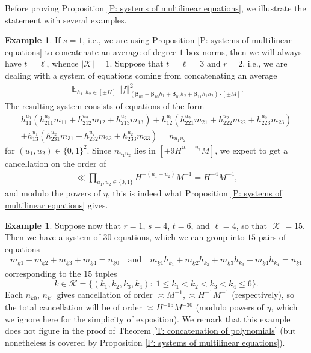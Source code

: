 \documentclass[11pt]{amsart}
\theoremstyle{definition}
\newtheorem{example}[lemma]{Example} %
\DeclareMathOperator*{\E}{\mathbb{E}}
\newcommand{\CK}{{\mathcal K}}
\newcommand{\bbeta}{{\boldsymbol{\beta}}}
\newcommand{\uk}{{\underline{k}}}
\newcommand{\norm}[1]{\left\Vert #1\right\Vert}
\newcommand{\inv}{^{-1}}
\begin{document}
Before proving Proposition \ref{P: systems of multilinear equations}, we illustrate the statement with several examples.
\begin{example}
    If $s=1$, i.e., we are using Proposition \ref{P: systems of multilinear equations} to concatenate an average of degree-$1$ box norms, then we will always have $t = \ell$, whence $|\CK|=1$. Suppose that $t=\ell = 3$ and $r=2$, i.e., we are dealing with a system of equations coming from concatenating an average
    \begin{align*}
        \E_{h_1, h_2\in[\pm H]}\norm{f}_{(\bbeta_{00} + \bbeta_{10}h_1 + \bbeta_{01}h_2 + \bbeta_{11}h_1h_2)\cdot[\pm M]}^2.
    \end{align*}
    The resulting system consists of equations of the form
    \begin{multline*}
        h_{11}^{u_1}(h_{211}^{u_2}m_{11} + h_{212}^{u_2}m_{12} + h_{213}^{u_2}m_{13}) + h_{12}^{u_1}(h_{221}^{u_2}m_{21} + h_{222}^{u_2}m_{22} + h_{223}^{u_2}m_{23})\\
        + h_{13}^{u_1}(h_{231}^{u_2}m_{31} + h_{232}^{u_2}m_{32} + h_{233}^{u_2}m_{33}) = {n_{u_1 u_2}}
    \end{multline*}
    for $(u_1, u_2)\in\{0,1\}^2$. Since $n_{u_1 u_2}$ lies in $[\pm 9H^{u_1+u_2}M]$, we expect to get a cancellation on the order of
    \begin{align*}
        \ll \prod_{u_1, u_2\in\{0,1\}} H^{-(u_1+u_2)}M\inv = H^{-4}M^{-4},
    \end{align*}
    and modulo the powers of $\eta$, this is indeed what Proposition \ref{P: systems of multilinear equations} gives.
    
\end{example}

\begin{example}
    Suppose now that $r=1$, $s=4$, $t=6$, and $\ell = 4$, so that $|\CK| = 15$. Then we have a system of $30$ equations, which we can group into $15$ pairs of equations
    \begin{align*}%
    m_{\uk 1} + m_{\uk 2} +m_{\uk 3}+m_{\uk 4} = n_{\uk 0}\quad \textrm{and}\quad m_{\uk 1} h_{k_1} + m_{\uk 2} h_{k_2}+m_{\uk 3} h_{k_3}+m_{\uk 4} h_{k_4} = n_{\uk 1}
\end{align*}
corresponding to the $15$ tuples $$\uk\in\CK = \{(k_1, k_2, k_3, k_4):\; 1\leq k_1 < k_2 < k_3 < k_4\leq 6\}.$$ Each $n_{\uk 0}$, $n_{\uk 1}$ gives cancellation of order $\asymp M\inv, \asymp H\inv M\inv$ (respectively), so the total cancellation will be of order  $\asymp H^{-15}M^{-30}$ (modulo powers of $\eta$, which we ignore here for the simplicity of exposition). We remark that this example does not figure in the proof of Theorem \ref{T: concatenation of polynomials} (but nonetheless is covered by Proposition \ref{P: systems of multilinear equations}).
\end{example}
\end{document}
